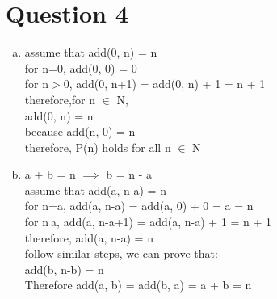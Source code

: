 \documentclass[11pt, a4paper]{article}
\begin{document}
\section*{Question 4}
\begin{enumerate}[(a)]
    \item
    assume that add(0, n) = n\\
    for n=0, add(0, 0) = 0\\
    for n$>$0, add(0, n+1) = add(0, n) + 1 = n + 1\\
    therefore,for n $\in$ N,\\
    add(0, n) = n\\
    because add(n, 0) = n\\
    therefore, P(n) holds for all n $\in$ N
    \item
    a + b = n $\implies$ b = n - a\\
    assume that add(a, n-a) = n\\
    for n=a, add(a, n-a) = add(a, 0) + 0 = a = n\\
    for n$\>$a, add(a, n-a+1) = add(a, n-a) + 1 = n + 1\\
    therefore, add(a, n-a) = n\\
    follow similar steps, we can prove that:\\
    add(b, n-b) = n\\
    Therefore add(a, b) = add(b, a) = a + b = n
\end{enumerate}
\end{document}
